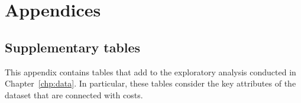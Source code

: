 \chapter*{Appendices}
\renewcommand{\thesection}{\Alph{section}}
\renewcommand{\thetable}{\Alph{section}.\arabic{table}}
\pagestyle{appendixstyle}

\appendix%
\section{Supplementary tables}\label{app:tables}

This appendix contains tables that add to the exploratory analysis conducted in
Chapter~\ref{chp:data}. In particular, these tables consider the key attributes
of the dataset that are connected with costs.


